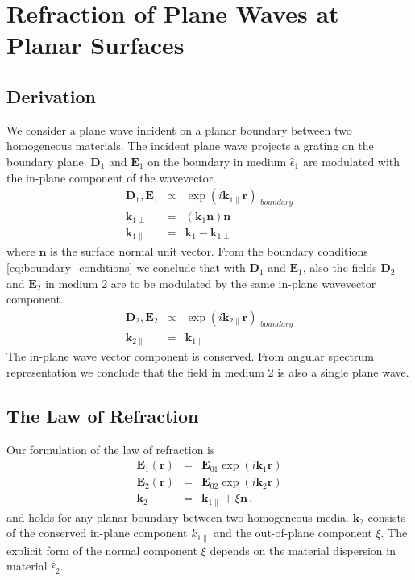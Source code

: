 \documentclass[12pt,a4paper,twoside,openright,BCOR10mm,headsepline,titlepage,abstracton,chapterprefix,final]{scrreprt}
\newcommand\Vector[1]{{\mathbf{#1}}}
\newcommand\Location{\Vector{r}}
\newcommand\wavenumber{k}
\newcommand\Wavevector{\Vector{\wavenumber}}
\newcommand\Tensor[1]{\hat{#1}}
\newcommand\scalarEfield{E}
\newcommand\scalarDfield{D}
\newcommand\Efield{\Vector{\scalarEfield}}
\newcommand\Dfield{\Vector{\scalarDfield}}
\newcommand\permittivity{\Tensor{\epsilon}}
\begin{document}
\section{Refraction of Plane Waves at Planar Surfaces}

\subsection{Derivation}
We consider a plane wave incident on a planar boundary between two homogeneous materials.
The incident plane wave projects a grating on the boundary plane. $\Dfield_1$ and $\Efield_1$ on the boundary in medium $\permittivity_1$ are modulated with the in-plane component of the wavevector. 
\begin{eqnarray}
 \Dfield_1, \Efield_1 &\propto& \exp( i \Wavevector_{1\parallel} \Location)|_{boundary} \\
 \Wavevector_{1\perp} &=& ( \Wavevector_1 \Vector{n} ) \Vector{n} \\
 \Wavevector_{1\parallel} &=& \Wavevector_1 - \Wavevector_{1\perp}
\end{eqnarray}
where $\Vector{n}$ is the surface normal unit vector.
From the boundary conditions \ref{eq:boundary_conditions} we conclude that with $\Dfield_1$ and $\Efield_1$, also the fields $\Dfield_2$ and $\Efield_2$ in medium 2 are to be modulated by the same in-plane wavevector component.
\begin{eqnarray}
  \Dfield_2, \Efield_2 &\propto& \exp( i \Wavevector_{2\parallel} \Location)|_{boundary} \\
  \Wavevector_{2\parallel} &=& \Wavevector_{1\parallel}
\end{eqnarray}
The in-plane wave vector component is conserved.
From angular spectrum representation we conclude that the field in medium 2 is also a single plane wave. 

\subsection{The Law of Refraction}
Our formulation of the law of refraction is
\begin{eqnarray}
 \Efield_1(\Location) &=& \Efield_{01} \exp(i \Wavevector_1 \Location) \\
 \Efield_2(\Location) &=& \Efield_{02} \exp(i \Wavevector_2 \Location) \\
 \Wavevector_{2} &=& \Wavevector_{1\parallel} + \xi \Vector{n}\,.\label{eq:xieqn}
\end{eqnarray}
and holds for any planar boundary between two homogeneous media. 
$\Vector{k}_2$ consists of the conserved in-plane component $\wavenumber_{1\parallel}$ and the out-of-plane component $\xi$. 
The explicit form of the normal component $\xi$ depends on the material dispersion in material $\permittivity_2$. 
\end{document}

